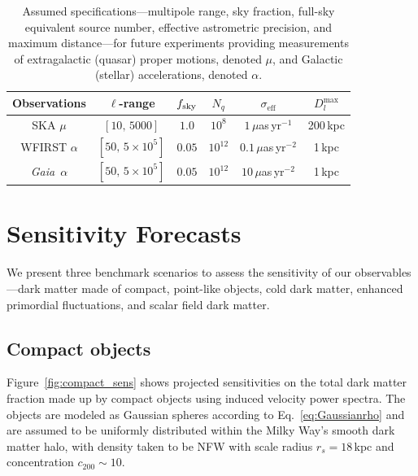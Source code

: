 \documentclass[prd,aps,10pt,nofootinbib,twocolumn,superscriptaddress,preprintnumbers,balancelastpage,longbibliography]{revtex4-1}
\newcommand{\Gaia}{\emph{Gaia}}
\begin{document}
\begin{table}[h]
\begin{center}
\begin{tabular}{c|ccccc}
\hline \hline
Observations & $\ell$-range & $f_{\rm sky}$ & $N_q$ & $\sigma_\mathrm{eff}$ & $D_l^\mathrm{max}$ \\ 
\hline \hline
SKA $\mu$ & $[10,\,5000]$ & $1.0$ & $10^8$ & $1\,\mu$as\,yr$^{-1}$ & 200\,kpc\\
\hline
WFIRST $\alpha$ & $[50,\,5\times10^5]$ &  $0.05$ &  $10^{12}$  & $0.1\,\mu$as\,yr$^{-2}$ & 1\,kpc   \\
\Gaia~$\alpha$ & $[50,\,5\times10^5]$ &  $0.05$ &  $10^{12}$  & $10\,\mu$as\,yr$^{-2}$ & 1\,kpc   \\
\hline
\end{tabular}
\end{center}
\caption{Assumed specifications---multipole range, sky fraction, full-sky equivalent source number, effective astrometric precision, and maximum distance---for future experiments providing measurements of extragalactic (quasar) proper motions, denoted $\mu$, and Galactic (stellar) accelerations, denoted $\alpha$.}
\label{tab:noise_specs}
\end{table}



\section{Sensitivity Forecasts}
\label{sec:forecasts}

We present three benchmark scenarios to assess the sensitivity of our observables---dark matter made of compact, point-like objects, cold dark matter, enhanced primordial fluctuations, and scalar field dark matter.

\subsection{Compact objects}
\label{sec:compact}

Figure~\ref{fig:compact_sens} shows projected sensitivities on the total dark matter fraction made up by compact objects using induced velocity power spectra. The objects are modeled as Gaussian spheres according to Eq.~\ref{eq:Gaussianrho} and are assumed to be uniformly distributed within the Milky Way's smooth dark matter halo, with density taken to be NFW with scale radius $r_s = 18$\,kpc and concentration $c_{200}\sim10$. 
\end{document}

